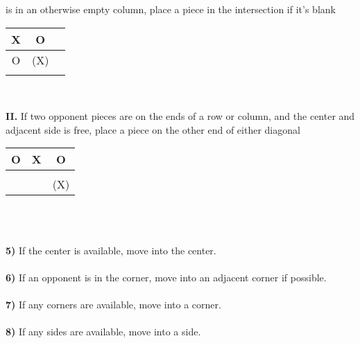\documentclass[12pt]{article}
\newcommand\tab[1][3cm]{\hspace*{#1}}
\begin{document}
	\tab\;\;\;\;is in an otherwise empty column, place a piece in the intersection if it's blank \\
\begin{center}
\begin{tabular}{c|c|c}
	X & O &   \\      \hline
	O &(X)&   \\      \hline
	  &   &  
  \end{tabular} \\
\end{center}
\tab\textbf{II.} If two opponent pieces are on the ends of a row or column, and the center and 
\tab\;\;\;\;\;\;adjacent side is free, place a piece on the other end of either diagonal \\
\begin{center}
	\begin{tabular}{c|c|c}
		O & X & O \\      \hline
		  &   &   \\      \hline
		  &   &(X) 
	  \end{tabular} \\
	\end{center}
~\\
\textbf{5)} If the center is available, move into the center. \\
\\
\textbf{6)} If an opponent is in the corner, move into an adjacent corner if possible. \\
\\
\textbf{7)} If any corners are available, move into a corner. \\
\\
\textbf{8)} If any sides are available, move into a side. \\
 
\end{document}
